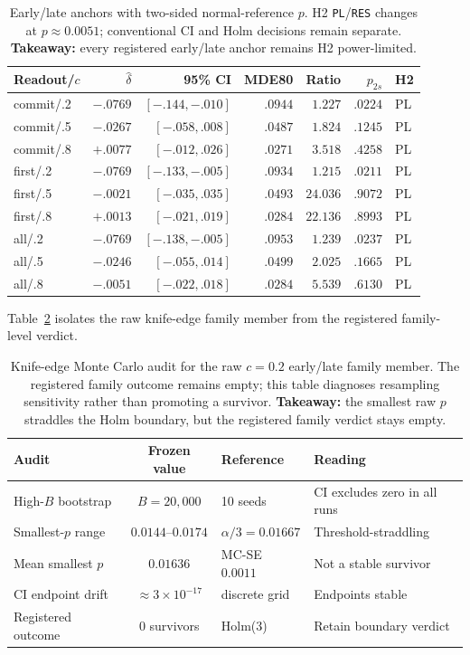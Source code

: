 \documentclass{article}
\begin{document}
\begin{table}[ht]
\caption{Early/late anchors with two-sided normal-reference $p$.  H2 \texttt{PL}/\texttt{RES}
changes at $p\approx0.0051$; conventional CI and Holm decisions remain separate.
\textbf{Takeaway:} every registered early/late anchor remains H2 power-limited.}
\label{tab:anchormde}
\centering\footnotesize
\setlength{\tabcolsep}{3pt}
\begin{tabular}{@{}lrrrrrl@{}}
\toprule
Readout/$c$ & $\hat\delta$ & 95\% CI & MDE80 & Ratio & $p_{2s}$ & H2 \\
\midrule
commit/.2 & $-.0769$ & $[-.144,-.010]$ & $.0944$ & $1.227$ & $.0224$ & PL \\
commit/.5 & $-.0267$ & $[-.058,.008]$ & $.0487$ & $1.824$ & $.1245$ & PL \\
commit/.8 & $+.0077$ & $[-.012,.026]$ & $.0271$ & $3.518$ & $.4258$ & PL \\
first/.2 & $-.0769$ & $[-.133,-.005]$ & $.0934$ & $1.215$ & $.0211$ & PL \\
first/.5 & $-.0021$ & $[-.035,.035]$ & $.0493$ & $24.036$ & $.9072$ & PL \\
first/.8 & $+.0013$ & $[-.021,.019]$ & $.0284$ & $22.136$ & $.8993$ & PL \\
all/.2 & $-.0769$ & $[-.138,-.005]$ & $.0953$ & $1.239$ & $.0237$ & PL \\
all/.5 & $-.0246$ & $[-.055,.014]$ & $.0499$ & $2.025$ & $.1665$ & PL \\
all/.8 & $-.0051$ & $[-.022,.018]$ & $.0284$ & $5.539$ & $.6130$ & PL \\
\bottomrule
\end{tabular}
\end{table}

Table~\ref{tab:mcstability} isolates the raw knife-edge family member from the registered
family-level verdict.

\begin{table}[ht]
\caption{Knife-edge Monte Carlo audit for the raw $c=0.2$ early/late family member.  The
registered family outcome remains empty; this table diagnoses resampling sensitivity rather than
promoting a survivor.  \textbf{Takeaway:} the smallest raw $p$ straddles the Holm boundary, but
the registered family verdict stays empty.}
\label{tab:mcstability}
\centering\small
\begin{tabularx}{\textwidth}{@{}lcl>{\raggedright\arraybackslash}X@{}}
\toprule
Audit & Frozen value & Reference & Reading \\
\midrule
High-$B$ bootstrap & $B=20{,}000$ & 10 seeds & CI excludes zero in all runs \\
Smallest-$p$ range & $0.0144$--$0.0174$ & $\alpha/3=0.01667$ & Threshold-straddling \\
Mean smallest $p$ & $0.01636$ & MC-SE $0.0011$ & Not a stable survivor \\
CI endpoint drift & $\approx3\times10^{-17}$ & discrete grid & Endpoints stable \\
Registered outcome & 0 survivors & Holm(3) & Retain boundary verdict \\
\bottomrule
\end{tabularx}
\end{table}
\end{document}
